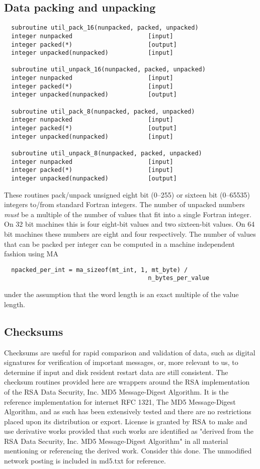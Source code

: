 \subsection{Data packing and unpacking}
\begin{verbatim}
  subroutine util_pack_16(nunpacked, packed, unpacked)
  integer nunpacked                     [input]
  integer packed(*)                     [output]
  integer unpacked(nunpacked)           [input]

  subroutine util_unpack_16(nunpacked, packed, unpacked)
  integer nunpacked                     [input]
  integer packed(*)                     [input]
  integer unpacked(nunpacked)           [output]

  subroutine util_pack_8(nunpacked, packed, unpacked)
  integer nunpacked                     [input]
  integer packed(*)                     [output]
  integer unpacked(nunpacked)           [input]

  subroutine util_unpack_8(nunpacked, packed, unpacked)
  integer nunpacked                     [input]
  integer packed(*)                     [input]
  integer unpacked(nunpacked)           [output]
\end{verbatim}
These routines pack/unpack unsigned eight bit (0--255) or sixteen bit
(0--65535) integers to/from standard Fortran integers.  The number of
unpacked numbers {\em must} be a multiple of the number of values that
fit into a single Fortran integer.  On 32 bit machines this is four
eight-bit values and two sixteen-bit values.  On 64 bit machines these
numbers are eight and four respectively.  The number of values that
can be packed per integer can be computed in a machine
independent fashion using MA
\begin{verbatim}
  npacked_per_int = ma_sizeof(mt_int, 1, mt_byte) / 
                                        n_bytes_per_value
\end{verbatim}
under the assumption that the word length is an exact multiple of the
value length.

\subsection{Checksums}

Checksums are useful for rapid comparison and validation of data, such
as digital signatures for verification of important messages, or, more
relevant to us, to determine if input and disk resident restart data
are still consistent.  The checksum routines provided here are
wrappers around the RSA implementation of the RSA Data Security, Inc.
MD5 Message-Digest Algorithm.  It is the reference implementation for
internet RFC 1321, The MD5 Message-Digest Algorithm, and as such has
been extensively tested and there are no restrictions placed upon its
distribution or export.  License is granted by RSA to make and use
derivative works provided that such works are identified as "derived
from the RSA Data Security, Inc. MD5 Message-Digest Algorithm" in all
material mentioning or referencing the derived work.  Consider this
done.  The unmodified network posting is included in md5.txt for
reference.

